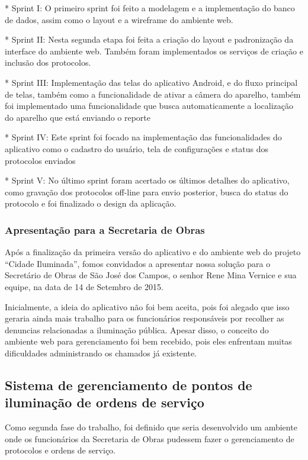 \documentclass[
	article,			%
	11pt,				%
	oneside,			%
	a4paper,			%
	english,			%
	brazil,				%
	sumario=tradicional
	]{abntex2}
\begin{document}
* Sprint I:
O primeiro sprint foi feito a modelagem e a implementação do banco de dados,
assim como o layout e a wireframe do ambiente web.

* Sprint II:
Nesta segunda etapa foi feita a criação do layout e padronização da interface
do ambiente web. Também foram implementados os serviços de criação e inclusão
dos protocolos.

* Sprint III:
Implementação das telas do aplicativo Android, e do fluxo principal de telas,
também como a funcionalidade de ativar a câmera do aparelho, também foi
implementado uma funcionalidade que busca automaticamente a localização do
aparelho que está enviando o reporte

* Sprint IV:
Este sprint foi focado na implementação das funcionalidades do aplicativo como
o cadastro do usuário, tela de configurações e status dos protocolos enviados

* Sprint V:
No último sprint foram acertado os últimos detalhes do aplicativo, como
gravação dos protocolos off-line para envio posterior, busca do status do
protocolo e foi finalizado o design da aplicação.

\subsubsection{Apresentação para a Secretaria de Obras}

Após a finalização da primeira versão do aplicativo e do ambiente web do
projeto “Cidade Iluminada”, fomos convidados a apresentar nossa solução para o
Secretário de Obras de São José dos Campos, o senhor Rene Mina Vernice e sua
equipe, na data de 14 de Setembro de 2015.

Inicialmente, a ideia do aplicativo não foi bem aceita, pois foi alegado que
isso geraria ainda mais trabalho para os funcionários responsáveis por
recolher as denuncias relacionadas a iluminação pública. Apesar disso, o
conceito do ambiente web para gerenciamento foi bem recebido, pois eles
enfrentam muitas dificuldades administrando os chamados já existente.

\subsection{Sistema de gerenciamento de pontos de iluminação de ordens de serviço}

Como segunda fase do trabalho, foi definido que seria desenvolvido um ambiente
onde os funcionários da Secretaria de Obras pudessem fazer o gerenciamento de
protocolos e ordens de serviço.
\end{document}

